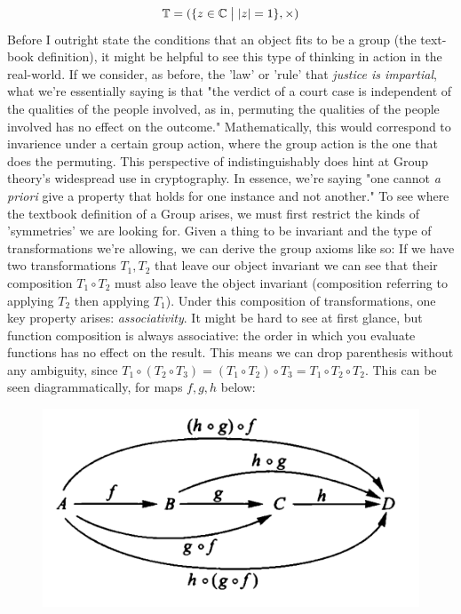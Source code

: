 \documentclass[11pt,a4paper]{article}
\newcommand{\complexes}{\mathbb{C}}
\begin{document}
\[
\mathbb{T} = ( \lbrace z \in \complexes \bigm| |z| = 1 \rbrace , \times )
\]
  Before I outright state the conditions that an object fits to be a group (the text-book definition), it might be helpful to see this type of thinking in action in the real-world. If we consider, as before, the 'law' or 'rule' that \textit{justice is impartial}, what we're essentially saying is that "the verdict of a court case is independent of the qualities of the people involved, as in, permuting the qualities of the people involved has no effect on the outcome." Mathematically, this would correspond to invarience under a certain group action, where the group action is the one that does the permuting. This perspective of indistinguishably does hint at Group theory's widespread use in cryptography. In essence, we're saying "one cannot \textit{a priori} give a property that holds for one instance and not another."
  To see where the textbook definition of a Group arises, we must first restrict the kinds of 'symmetries' we are looking for. Given a thing to be invariant and the type of transformations we're allowing, we can derive the group axioms like so: If we have two transformations $T_1, T_2$ that leave our object invariant we can see that their composition $T_1 \circ T_2$ must also leave the object invariant (composition referring to applying $T_2$ then applying $T_1$). Under this composition of transformations, one key property arises: \textit{associativity}. It might be hard to see at first glance, but function composition is always associative: the order in which you evaluate functions has no effect on the result. This means we can drop parenthesis without any ambiguity, since $T_1 \circ (T_2 \circ T_3) = (T_1 \circ T_2) \circ T_3 = T_1 \circ T_2 \circ T_2$. This can be seen diagrammatically, for maps $f, g, h$ below:
\begin{figure}[h]
\begin{center}
\includegraphics[scale=.4]{images/associativitydiagram} 
\end{center}
\end{figure}
\end{document}
